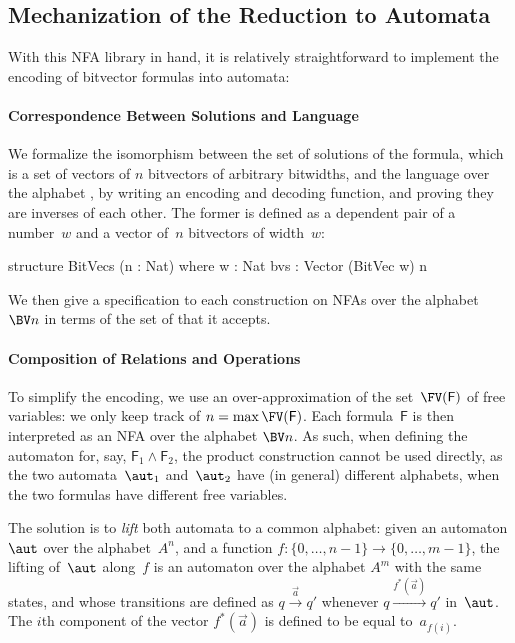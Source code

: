 \subsection{Mechanization of the Reduction to Automata}

With this NFA library in hand, it is relatively straightforward to implement the
encoding of bitvector formulas into automata:

\paragraph{Correspondence Between Solutions and Language}

We formalize the isomorphism between the set of solutions of the
formula, which is a set of vectors of $n$ bitvectors of arbitrary bitwidths,
and the language over the alphabet , by writing an encoding
and decoding function, and proving they are inverses of each other.
%
The former is defined as a dependent pair of a number~$w$ and a vector of~$n$
bitvectors of width~$w$:
%
\begin{lean}
 structure BitVecs (n : Nat) where
  w : Nat
  bvs : Vector (BitVec w) n
\end{lean}
%
We then give a specification to each construction on NFAs over the alphabet~$\BV
n$ in terms of the set of  that it accepts.

\paragraph{Composition of Relations and Operations}

To simplify the encoding, we use an over-approximation of the set~$\FV(\mathsf
F)$ of free variables: we only keep track of $n = \max \FV(\mathsf F)$.
%
Each formula~$\textsf{F}$ is then interpreted as an NFA over the alphabet $\BV
n$. As such, when defining the automaton for, say, $\mathsf F_1 \land \mathsf
F_2$, the product construction cannot be used directly, as the two
automata~$\aut_1$ and~$\aut_2$ have (in general) different alphabets, when the
two formulas have different free variables.
%

The solution is to \emph{lift} both automata to a common alphabet: given an
automaton $\aut$ over the alphabet~$A^n$, and a function $f : \{0, \dots, n-1\}
\to \{0, \dots, m-1\}$, the lifting of~$\aut$ along~$f$ is an automaton over the
alphabet $A^m$ with the same states, and whose transitions are defined as $q
\xrightarrow{\vec{a}} q'$ whenever $q \xrightarrow{f^*(\vec{a})} q'$ in~$\aut$.
%
The $i$th component of the vector $f^*(\vec{a})$ is defined to be equal
to~$a_{f(i)}$.

